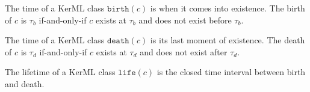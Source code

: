 \dfexists

\pn The  time of a KerML class $\texttt{birth}(c)$ is when it comes into existence.  The birth of $c$ is $\tau_b$ if-and-only-if $c$ exists at $\tau_b$ and does not exist before $\tau_b$.

\dfbirth

\pn The  time of a KerML class $\texttt{death}(c)$ is its last moment of existence.  The death of $c$ is $\tau_d$ if-and-only-if $c$ exists at $\tau_d$ and does not exist after $\tau_d$.

\dfdeath

\pn The lifetime of a KerML class $\texttt{life}(c)$ is the closed time interval between birth and death.

\dflifetime

